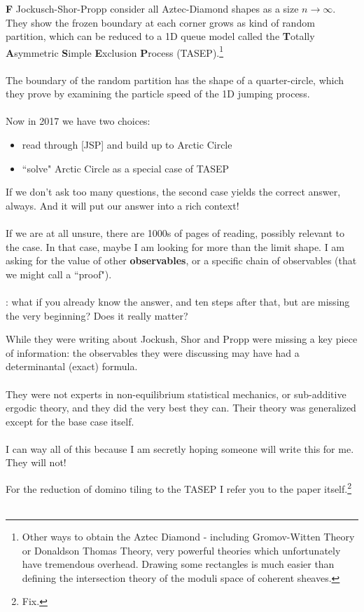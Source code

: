 \documentclass[12pt]{article}
\begin{document}
\noindent \textbf{F} Jockusch-Shor-Propp consider all Aztec-Diamond shapes as a size $n \to \infty$.  They show the frozen boundary at each corner grows as kind of random partition, which can be reduced to a 1D queue model called the \textbf{T}otally \textbf{A}symmetric \textbf{S}imple \textbf{E}xclusion \textbf{P}rocess (TASEP).\footnote{
Other ways to obtain the Aztec Diamond - including Gromov-Witten Theory or Donaldson Thomas Theory, very powerful theories which unfortunately have tremendous overhead.  Drawing some rectangles is much easier than defining the intersection theory of the moduli space of coherent sheaves. }  \\ \\ 
The boundary of the random partition has the shape of a quarter-circle, which they prove by examining the particle speed of the 1D jumping process.  \\ \\
Now in 2017 we have two choices:
\begin{itemize}
\item read through [JSP] and build up to Arctic Circle
\item ``solve" Arctic Circle as a special case of TASEP
\end{itemize}
If we don't ask too many questions, the second case yields the correct answer, always. And it will put our answer into a rich context! \\ \\
If we are at all unsure, there are 1000s of pages of reading, possibly relevant to the case.  In that case, maybe I am looking for more than the limit shape.  I am asking for the value of other \textbf{observables}, or a specific chain of observables (that we might call a ``proof"). \\ \\
{\color{green}{Logically}}: what if you already know the answer,  and ten steps after that,  but are missing the very beginning? Does it really matter? 

\newpage 

\noindent While they were writing about Jockush, Shor and Propp were missing a key piece of information: the observables they were discussing may have had a determinantal (exact) formula.  \\ \\ 
They were not experts in non-equilibrium statistical mechanics, or sub-additive ergodic theory, and they did the very best they can.  Their theory was generalized except for the base case itself.  \\ \\
I can way all of this because I am secretly hoping someone will write this for me.  They will not!

\newpage

\noindent For the reduction of domino tiling to the TASEP I refer you to the paper itself.\footnote{Fix.} \\ \\
\end{document}
